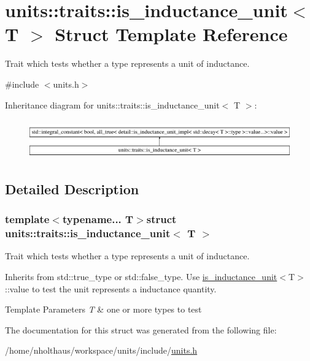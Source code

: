 \hypertarget{structunits_1_1traits_1_1is__inductance__unit}{}\section{units\+:\+:traits\+:\+:is\+\_\+inductance\+\_\+unit$<$ T $>$ Struct Template Reference}
\label{structunits_1_1traits_1_1is__inductance__unit}


Trait which tests whether a type represents a unit of inductance.  




{\ttfamily \#include $<$units.\+h$>$}

Inheritance diagram for units\+:\+:traits\+:\+:is\+\_\+inductance\+\_\+unit$<$ T $>$\+:\begin{figure}[H]
\begin{center}
\leavevmode
\includegraphics[height=1.712538cm]{structunits_1_1traits_1_1is__inductance__unit}
\end{center}
\end{figure}


\subsection{Detailed Description}
\subsubsection*{template$<$typename... T$>$struct units\+::traits\+::is\+\_\+inductance\+\_\+unit$<$ T $>$}

Trait which tests whether a type represents a unit of inductance. 

Inherits from {\ttfamily std\+::true\+\_\+type} or {\ttfamily std\+::false\+\_\+type}. Use {\ttfamily \hyperlink{structunits_1_1traits_1_1is__inductance__unit}{is\+\_\+inductance\+\_\+unit}$<$T$>$\+::value} to test the unit represents a inductance quantity. 
\begin{DoxyTemplParams}{Template Parameters}
{\em T} & one or more types to test \\
\hline
\end{DoxyTemplParams}


The documentation for this struct was generated from the following file\+:\begin{DoxyCompactItemize}
\item 
/home/nholthaus/workspace/units/include/\hyperlink{units_8h}{units.\+h}\end{DoxyCompactItemize}
